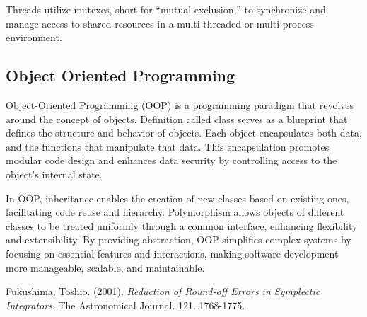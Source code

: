 \documentclass{article}
\begin{document}
Threads utilize mutexes, short for ``mutual exclusion,''
to synchronize and manage access to shared resources 
in a multi-threaded or multi-process environment. 

\subsection{Object Oriented Programming}

Object-Oriented Programming (OOP) is a programming paradigm that revolves around the concept of objects. 
Definition called class serves as a blueprint that defines the structure and behavior of objects. 
Each object encapsulates both data, and the functions that manipulate that data. 
This encapsulation promotes modular code design and enhances data security by controlling access to the object's internal state. 

In OOP, inheritance enables the creation of new classes based on existing ones, facilitating code reuse and hierarchy. 
Polymorphism allows objects of different classes to be treated uniformly through a common interface, enhancing flexibility and extensibility. 
By providing abstraction, OOP simplifies complex systems by focusing on essential features and interactions, making software development more manageable, scalable, and maintainable.


\begin{thebibliography}{9}
    Fukushima, Toshio. (2001). \emph{Reduction of Round-off Errors in Symplectic Integrators}. The Astronomical Journal. 121. 1768-1775. 
\end{thebibliography}
\end{document}
